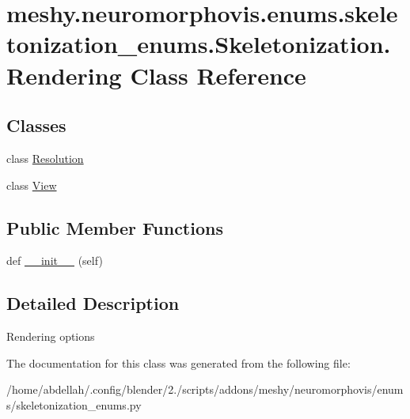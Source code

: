 \hypertarget{classmeshy_1_1neuromorphovis_1_1enums_1_1skeletonization__enums_1_1Skeletonization_1_1Rendering}{}\section{meshy.\+neuromorphovis.\+enums.\+skeletonization\+\_\+enums.\+Skeletonization.\+Rendering Class Reference}
\label{classmeshy_1_1neuromorphovis_1_1enums_1_1skeletonization__enums_1_1Skeletonization_1_1Rendering}


 


\subsection*{Classes}
\begin{DoxyCompactItemize}
\item 
class \hyperlink{classmeshy_1_1neuromorphovis_1_1enums_1_1skeletonization__enums_1_1Skeletonization_1_1Rendering_1_1Resolution}{Resolution}
\item 
class \hyperlink{classmeshy_1_1neuromorphovis_1_1enums_1_1skeletonization__enums_1_1Skeletonization_1_1Rendering_1_1View}{View}
\end{DoxyCompactItemize}
\subsection*{Public Member Functions}
\begin{DoxyCompactItemize}
\item 
def \hyperlink{classmeshy_1_1neuromorphovis_1_1enums_1_1skeletonization__enums_1_1Skeletonization_1_1Rendering_ad5e2ad610bb65d0b6c5c31fdf10eee2b}{\+\_\+\+\_\+init\+\_\+\+\_\+} (self)\hypertarget{classmeshy_1_1neuromorphovis_1_1enums_1_1skeletonization__enums_1_1Skeletonization_1_1Rendering_ad5e2ad610bb65d0b6c5c31fdf10eee2b}{}\label{classmeshy_1_1neuromorphovis_1_1enums_1_1skeletonization__enums_1_1Skeletonization_1_1Rendering_ad5e2ad610bb65d0b6c5c31fdf10eee2b}

\end{DoxyCompactItemize}


\subsection{Detailed Description}


\begin{DoxyVerb}Rendering options
\end{DoxyVerb}
 

The documentation for this class was generated from the following file\+:\begin{DoxyCompactItemize}
\item 
/home/abdellah/.\+config/blender/2./scripts/addons/meshy/neuromorphovis/enums/skeletonization\+\_\+enums.\+py\end{DoxyCompactItemize}
